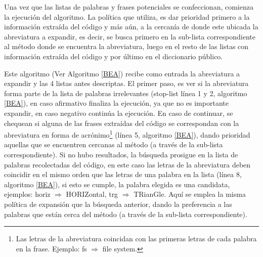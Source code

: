 Una vez que las listas de palabras y frases potenciales se confeccionan, comienza la ejecución del algoritmo. La política que utiliza, es dar prioridad primero a la información extraída del código y más aún, a la cercanía de donde este ubicada la abreviatura a expandir, es decir, se busca primero en la sub-lista correspondiente al método donde se encuentra la abreviatura, luego en el resto de las listas con información extraída del código y por último en el diccionario público.

Este algoritmo (Ver Algoritmo \ref{BEA}) recibe como entrada la abreviatura a expandir y las 4 listas antes descriptas. El primer paso, es ver si la abreviatura forma parte de la lista de palabras irrelevantes (stop-list línea 1 y 2, algoritmo \ref{BEA}), en caso afirmativo finaliza la ejecución, ya que no es importante expandir, en caso negativo continúa la ejecución. En caso de continuar, se chequean si alguna de las frases extraídas del código se correspondan con la abreviatura en forma de acrónimo\footnote[1]{Las letras de la abreviatura coincidan con las primeras letras de cada palabra en la frase. Ejemplo: fs $\Rightarrow$ file system.} (línea 5, algoritmo \ref{BEA}), dando prioridad aquellas que se encuentren cercanas al método (a través de la sub-lista correspondiente).
Si no hubo resultados, la búsqueda prosigue en la lista de palabras recolectadas del código, en este caso las letras de la abreviatura deben coincidir en el mismo orden que las letras de una palabra en la lista (línea 8, algoritmo \ref{BEA}), si esto se cumple, la palabra elegida es una candidata, ejemplos: \mbox{\textsf{horiz}} $\Rightarrow$ HORIZ\textsf{ontal}, \textsf{trg} $\Rightarrow$ TR\textsf{ian}G\textsf{le}. Aquí se emplea la misma política de expansión que la búsqueda anterior, dando la preferencia a las palabras que están cerca del método (a través de la sub-lista correspondiente). 


